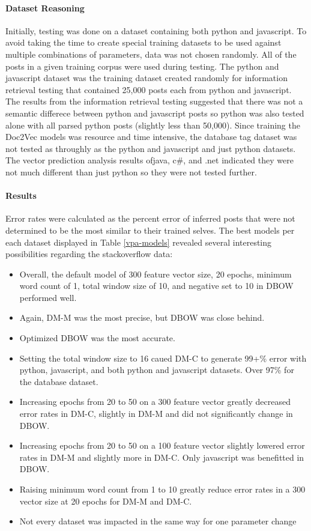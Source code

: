\paragraph{Dataset Reasoning} Initially, testing was done on a dataset containing both python and javascript. To avoid taking the time to create special training datasets to be used against multiple combinations of parameters, data was not chosen randomly. All of the posts in a given training corpus were used during testing. The python and javascript dataset was the training dataset created randomly for information retrieval testing that contained 25,000 posts each from python and javascript. The results from the information retrieval testing suggested that there was not a semantic differece between python and javascript posts so python was also tested alone with all parsed python posts (slightly less than 50,000). Since training the Doc2Vec models was resource and time intensive, the database tag dataset was not tested as throughly as the python and javascript and just python datasets. The vector prediction analysis results ofjava, c\#, and .net indicated they were not much different than just python so they were not tested further.  

\paragraph{Results} Error rates were calculated as the percent error of inferred posts that were not determined to be the most similar to their trained selves. The best models per each dataset displayed in Table \ref{vpa-models} revealed several interesting possibilities regarding the stackoverflow data:

\begin{itemize}
  \item Overall, the default model of 300 feature vector size, 20 epochs, minimum word count of 1, total window size of 10, and negative set to 10 in DBOW performed well.
  \item Again, DM-M was the most precise, but DBOW was close behind.
  \item Optimized DBOW was the most accurate.
  \item Setting the total window size to 16 caued DM-C to generate 99+\% error with python, javascript, and both python and javascript datasets. Over 97\% for the database dataset.
  \item Increasing epochs from 20 to 50 on a 300 feature vector greatly decreased error rates in DM-C, slightly in DM-M and did not significantly change in DBOW. 
  \item Increasing epochs from 20 to 50 on a 100 feature vector slightly lowered error rates in DM-M and slightly more in DM-C. Only javascript was benefitted in DBOW.
  \item Raising minimum word count from 1 to 10 greatly reduce error rates in a 300 vector size at 20 epochs for DM-M and DM-C.
 \item Not every dataset was impacted in the same way for one parameter change
\end{itemize}

